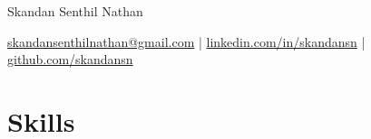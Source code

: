                        

% 





\centerline{\Huge Skandan Senthil Nathan}

\vspace{5pt}

\centerline{\href{mailto:skandansenthilnathan@gmail.com}{skandansenthilnathan@gmail.com} | \href{https://www.linkedin.com/in/skandansn/}{linkedin.com/in/skandansn} | \href{https://github.com/skandansn}{github.com/skandansn}}

\vspace{-10pt}

\section*{Skills}
\label{skillsSection}


